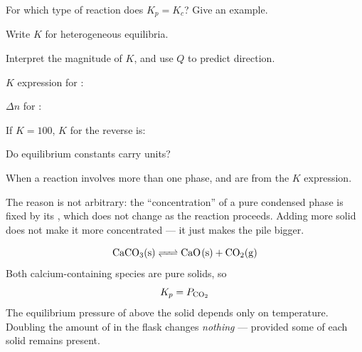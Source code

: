 \documentclass{apchem-notes}
\begin{document}
\begin{exitticket}
For which type of reaction does $K_p = K_c$? Give an example.
\end{exitticket}


\begin{objectives}
  \item Write $K$ for heterogeneous equilibria.
  \item Interpret the magnitude of $K$, and use $Q$ to predict direction.
\end{objectives}


\begin{warmup}[4]
  \item $K$ expression for :
  \item $\Delta n$ for : 
  \item If $K = 100$, $K$ for the reverse is:
  \item Do equilibrium constants carry units? 
\end{warmup}



When a reaction involves more than one phase,  and
 are  from the $K$ expression.

The reason is not arbitrary: the ``concentration'' of a pure condensed phase
is fixed by its , which does not change as the
reaction proceeds. Adding more solid does not make it more concentrated --- it
just makes the pile bigger.

\begin{workedexample}
\[ \ce{CaCO3(s) <=> CaO(s) + CO2(g)} \]
Both calcium-containing species are pure solids, so
\[ K_p = P_{\ce{CO2}} \]
The equilibrium pressure of  above the solid depends only on
temperature. Doubling the amount of  in the flask changes
\emph{nothing} --- provided some of each solid remains present.
\end{workedexample}
\end{document}
